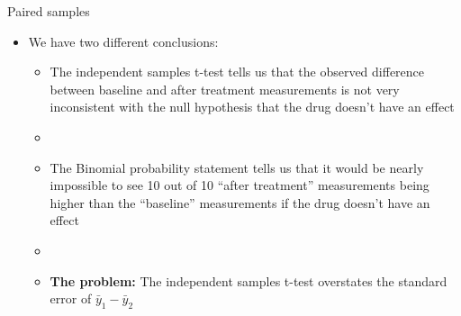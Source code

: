 \documentclass[xcolor=dvipsnames]{beamer}
\begin{document}
\begin{frame}{Paired samples}
	\begin{itemize}
		\item We have two different conclusions:
		\begin{itemize}
			\item The independent samples t-test tells us that the observed difference between baseline and after treatment measurements is not very inconsistent with the null hypothesis that the drug doesn't have an effect
			\item[]
			\item The Binomial probability statement tells us that it would be nearly impossible to see 10 out of 10 ``after treatment'' measurements being higher than the ``baseline'' measurements if the drug doesn't have an effect
			\item[] 
			\item \textbf{The problem:} The independent samples t-test overstates the standard error of $\bar{y}_1 - \bar{y}_2$
		\end{itemize}
	\end{itemize}
\end{frame}
\end{document}
